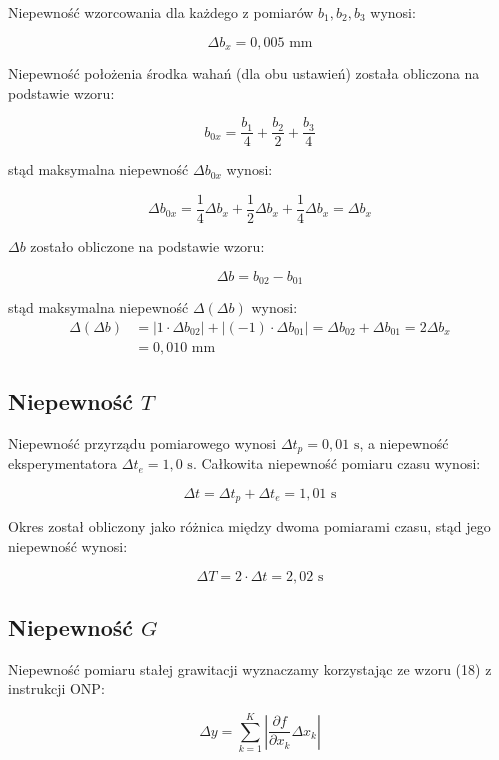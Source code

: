 \documentclass[a4paper,12pt]{article}
\begin{document}
Niepewność wzorcowania dla każdego z pomiarów $b_1, b_2, b_3$ wynosi:

$$
    \Delta b_x = 0,005 \text{ mm}
$$

Niepewność położenia środka wahań (dla obu ustawień) została obliczona na podstawie wzoru:

$$
    b_{0x} = \frac{b_1}{4} + \frac{b_2}{2} + \frac{b_3}{4}
$$

stąd maksymalna niepewność $\Delta b_{0x}$ wynosi:

$$
    \Delta b_{0x} = \frac{1}{4}\Delta b_x + \frac{1}{2}\Delta b_x + \frac{1}{4}\Delta b_x = \Delta b_x
$$

$\Delta b$ zostało obliczone na podstawie wzoru:

$$
    \Delta b = b_{02} - b_{01}
$$

stąd maksymalna niepewność $\Delta(\Delta b)$ wynosi:
\begin{align*}
    \Delta(\Delta b) & = |1 \cdot \Delta b_{02}| + |(-1) \cdot \Delta b_{01}| = \Delta b_{02} + \Delta b_{01} = 2\Delta b_x \\
                     & = 0,010 \text{ mm}
\end{align*}


\subsection{Niepewność $T$}

Niepewność przyrządu pomiarowego wynosi $\Delta t_p = 0{,}01 \text{ s}$, a niepewność eksperymentatora $\Delta t_e = 1{,}0 \text{ s}$. Całkowita niepewność pomiaru czasu wynosi:

$$
    \Delta t = \Delta t_p + \Delta t_e = 1{,}01 \text{ s}
$$

Okres został obliczony jako różnica między dwoma pomiarami czasu, stąd jego niepewność wynosi:

$$
    \Delta T = 2 \cdot \Delta t = 2{,}02 \text{ s}
$$

\subsection{Niepewność $G$}

Niepewność pomiaru stałej grawitacji wyznaczamy korzystając ze wzoru (18) z instrukcji ONP:

\begin{equation*}
    \label{eq:delta_y}
    \Delta y = \sum_{k=1}^{K} \left| \frac{\partial f}{\partial x_k} \Delta x_k \right|
\end{equation*}
\end{document}
